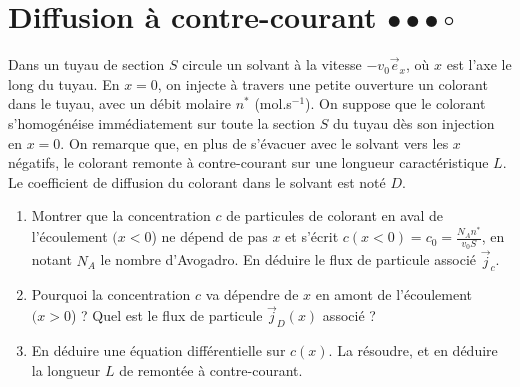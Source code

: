 \newpage

\section{Diffusion à contre-courant $\bullet\bullet\bullet\circ$}

Dans un tuyau de section $S$ circule un solvant à la vitesse $-v_0\vec{e}_x$, où $x$ est l'axe le long du tuyau. En $x=0$, on injecte à travers une petite ouverture un colorant dans le tuyau, avec un débit molaire $n^*$ (mol.s$^{-1}$). On suppose que le colorant s'homogénéise immédiatement sur toute la section $S$ du tuyau dès son injection en $x=0$. On remarque que, en plus de s'évacuer avec le solvant vers les $x$ négatifs, le colorant remonte à contre-courant sur une longueur caractéristique $L$. Le coefficient de diffusion du colorant dans le solvant est noté $D$.

\begin{enumerate}

	\item Montrer que la concentration $c$ de particules de colorant en aval de l'écoulement $(x<0$) ne dépend de pas $x$ et s'écrit $c(x<0)=c_0=\frac{N_A n^*}{v_0S}$, en notant $N_A$ le nombre d'Avogadro. En déduire le flux de particule associé $\vec{j}_c$.
	
	\item Pourquoi la concentration $c$ va dépendre de $x$ en amont de l'écoulement $(x>0$) ? Quel est le flux de particule $\vec{j}_D(x)$ associé ?
	
	\item En déduire une équation différentielle sur $c(x)$. La résoudre, et en déduire la longueur $L$ de remontée à contre-courant.

\end{enumerate}

\newpage

